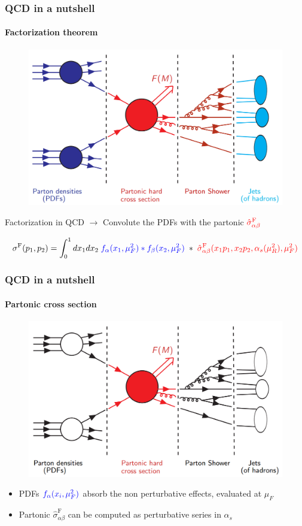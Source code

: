 \documentclass[aspectratio=43]{beamer}
\begin{document}
\begin{frame}

	\frametitle{QCD in a nutshell}
	\framesubtitle{Factorization theorem}

	\begin{figure}
		\includegraphics[width = 7 cm]{plots/factorization_1.png}
	\end{figure}
	
	Factorization in QCD $\longrightarrow$ Convolute the {\color{blue}PDFs} with the partonic ${\color{red}\hat{\sigma}_{\alpha\beta}^{\textrm{F}}}$
	
	\begin{equation}
		\sigma^{\textrm{F}}(p_{1}, p_{2}) =
		\int_{0}^{1} dx_{1} dx_{2} \; {\color{blue} f_{\alpha}(x_{1}, \mu_{F}^{2}) \ast f_{\beta}(x_{2}, \mu_{F}^{2})}
		\; \ast \;  
		{\color{red}\hat{\sigma}^{\textrm{F}}_{\alpha \beta}(x_{1}p_{1}, x_{2}p_{2}, \alpha_{s}(\mu_{R}^{2}), \mu_{F}^{2})} \nonumber
	\end{equation}

\end{frame}

\begin{frame}
	
	\frametitle{QCD in a nutshell}
	\framesubtitle{Partonic cross section}
	
	\begin{figure}
		\includegraphics[width = 7 cm]{plots/factorization_2.png}
	\end{figure}
	
	\begin{itemize}
		\item {\color{blue}PDFs} ${\color{blue} f_{\alpha}(x_{i}, \mu_{F}^{2})}$ absorb the non perturbative effects, evaluated at $\mu_{F}$
		\item Partonic {\color{red}$\hat{\sigma}^{\textrm{F}}_{\alpha \beta}$} can be computed as perturbative series in $\alpha_{s}$
	\end{itemize}
	
\end{frame}
\end{document}
